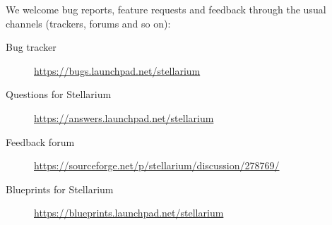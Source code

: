 We welcome bug reports, feature requests and feedback through the
usual channels (trackers, forums and so on):
\begin{description}
\item[Bug tracker] \url{https://bugs.launchpad.net/stellarium}
\item[Questions for Stellarium] \url{https://answers.launchpad.net/stellarium}
\item[Feedback forum] \url{https://sourceforge.net/p/stellarium/discussion/278769/}
\item[Blueprints for Stellarium] \url{https://blueprints.launchpad.net/stellarium}
\end{description}



